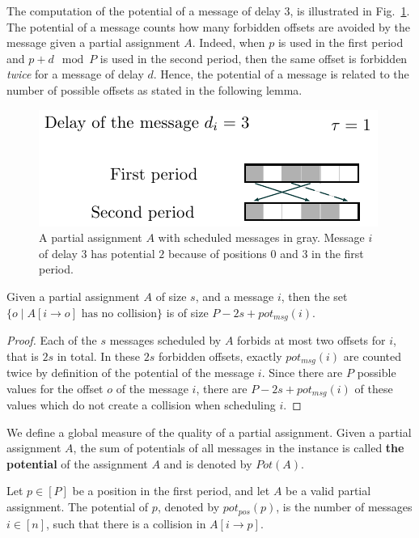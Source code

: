 \documentclass[a4paper,UKenglish,cleveref, autoref, thm-restate]{lipics-v2019}
\begin{document}
The computation of the potential of a message of delay $3$, is illustrated in Fig.~\ref{fig:messagepotential}. The potential of a message counts how many forbidden offsets are avoided by the message given a partial assignment $A$.
Indeed, when $p$ is used in the first period and $p+d \mod P$ is used in the second period, then the same offset is forbidden \emph{twice} for a message of delay $d$. Hence, the potential of a message is related to the number of possible offsets as stated in the following lemma. 
\begin{figure}
\begin{center}
\includegraphics[scale=1]{messagepotential}
\end{center}
\caption{A partial assignment $A$ with scheduled messages in gray. Message $i$ of delay $3$ has potential $2$ because of positions $0$ and $3$ in the first period.}
\label{fig:messagepotential}
\end{figure}

\begin{lemma}\label{lemma:pot_msg}
Given a partial assignment $A$ of size $s$, and a message $i$, then the set $\{o \mid A[i \rightarrow o] \text{ has no collision}\}$ is of size $P - 2s + pot_{msg}(i)$.
\end{lemma}
\begin{proof}
 Each of the $s$ messages scheduled by $A$ forbids at most two offsets for $i$, that is $2s$ in total. In these $2s$ forbidden offsets, exactly $pot_{msg}(i)$ are counted twice by definition of the potential of the message $i$. Since there are $P$ possible values for the offset $o$ of the message $i$, there are $P - 2s + pot_{msg}(i)$ of these values which do not create a collision when scheduling $i$.
\end{proof}

We define a global measure of the quality of a partial assignment. 
Given a partial assignment $A$, the sum of potentials of all messages in the instance is called \textbf{the potential} of the assignment $A$ and is denoted by $Pot(A)$. 


\begin{definition}
Let $p \in [P]$ be a position in the first period, and let $A$ be a valid partial assignment. The potential of $p$, denoted by $pot_{pos}(p)$, is the number of messages $i \in [n]$, such that there is a collision in $A[i \rightarrow p]$. 
\end{definition}
\end{document}
